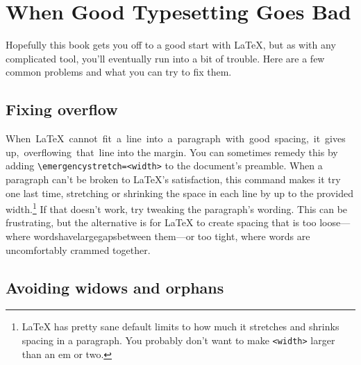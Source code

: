 \chapter{When Good Typesetting Goes Bad}

Hopefully this book gets you off to a good start with \LaTeX,
but as with any complicated tool, you'll eventually run into a bit of trouble.
Here are a few common problems and what you can try to fix them.

\section{Fixing overflow}

\mbox{When \LaTeX{} cannot fit a line into a paragraph with good spacing,
it gives up, overflowing that line}
into the margin.
You can sometimes remedy this by adding
\verb|\emergencystretch=<width>| to the document's preamble.
When a paragraph can't be broken to \LaTeX's satisfaction,
this command makes it try one last time,
stretching or shrinking the space in each line by up to the provided
width.\punckern\footnote{\LaTeX{} has pretty sane default limits to how much
it stretches and shrinks spacing in a paragraph.
You probably don't want to make \texttt{<width>} larger than an em or two.}
If that doesn't work, try tweaking the paragraph's wording.
This can be frustrating, but the alternative is for \LaTeX{} to create spacing
that is too loose---where\enspace
words\enspace have\enspace large\quad gaps\quad between\enspace
them---or too tight, where\! words\! are\! uncomfortably\! crammed\! together.

\section{Avoiding widows and orphans}

